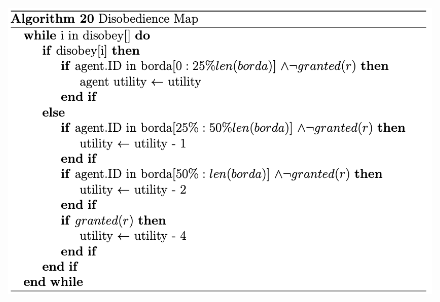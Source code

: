 
\begin{figure}[htb]
    \centering
    \includegraphics[scale=0.7]{006_team_3_agent_design/FIGS/Algo20.png}
    \label{fig:algo20}
\end{figure}




